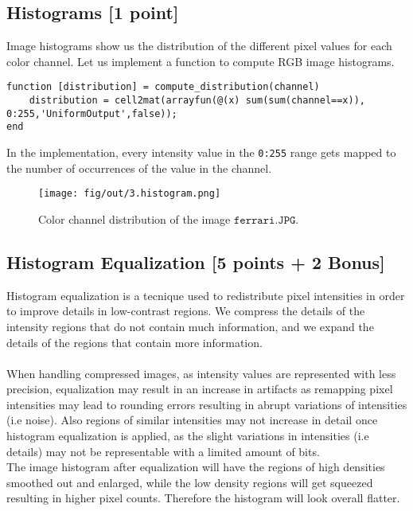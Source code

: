 \documentclass[tikz,14pt,fleqn]{article}
\begin{document}
\subsection{Histograms [1 point]}
Image histograms show us the distribution of the different pixel values for each color channel. Let us implement a function to compute RGB image histograms.
\begin{verbatim}
function [distribution] = compute_distribution(channel)
    distribution = cell2mat(arrayfun(@(x) sum(sum(channel==x)), 0:255,'UniformOutput',false));
end
\end{verbatim}
In the implementation, every intensity value in the \verb|0:255| range gets mapped to the number of occurrences of the value in the channel.
\begin{figure}[h!]
    \centering
    \texttt{[image: fig/out/3.histogram.png]}
    \caption{Color channel distribution of the image $\texttt{ferrari.JPG}$.}
\end{figure}
\subsection{Histogram Equalization [5 points + 2 Bonus]}
Histogram equalization is a tecnique used to redistribute pixel intensities in order to improve details in low-contrast regions. We compress the details of the intensity regions that do not contain much information, and we expand the details of the regions that contain more information.\\\\
When handling compressed images, as intensity values are represented with less precision, equalization may result in an increase in artifacts as remapping pixel intensities may lead to rounding errors resulting in abrupt variations of intensities (i.e noise). Also regions of similar intensities may not increase in detail once histogram equalization is applied, as the slight variations in intensities (i.e details) may not be representable with a limited amount of bits.\\
The image histogram after equalization will have the regions of high densities smoothed out and enlarged, while the low density regions will get squeezed resulting in higher pixel counts. Therefore the histogram will look overall flatter.
\end{document}

